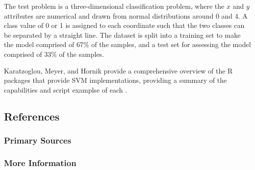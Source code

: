 The test problem is a three-dimensional classification problem, where the $x$ and $y$ attributes are numerical and drawn from normal distributions around 0 and 4. A class value of 0 or 1 is assigned to each coordinate such that the two classes can be separated by a straight line. The dataset is split into a training set to make the model comprised of 67\% of the samples, and a test set for assessing the model comprised of 33\% of the samples.



Karatzoglou, Meyer, and Hornik provide a comprehensive overview of the R packages that provide SVM implementations, providing a summary of the capabilities and script examplse of each \cite{Karatzoglou2006}.


\subsection{References}

\subsubsection{Primary Sources}



\subsubsection{More Information}



